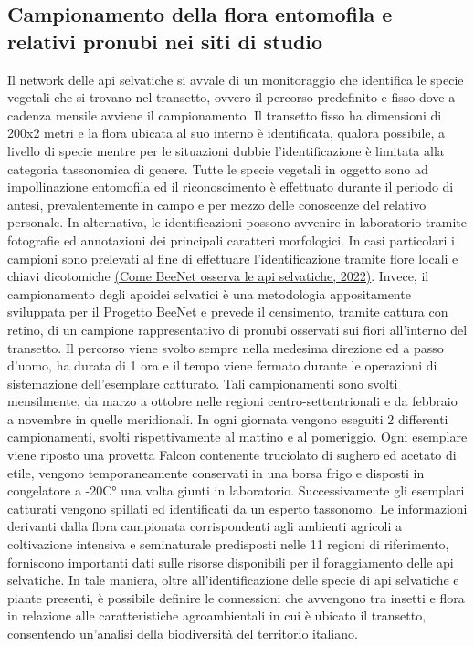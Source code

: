 \documentclass[main.tex]{subfiles}
\begin{document}
\subsection{Campionamento della flora entomofila e relativi pronubi nei siti di studio}

Il network delle api selvatiche si avvale di un monitoraggio che identifica le specie vegetali che si trovano nel transetto, ovvero il percorso predefinito e fisso dove a cadenza mensile avviene il campionamento. Il transetto fisso ha dimensioni di 200x2 metri e la flora ubicata al suo interno è identificata, qualora possibile, a livello di specie mentre per le situazioni dubbie l’identificazione è limitata alla categoria tassonomica di genere. Tutte le specie vegetali in oggetto sono ad impollinazione entomofila ed il riconoscimento è effettuato durante il periodo di antesi, prevalentemente in campo e per mezzo delle conoscenze del relativo personale. In alternativa, le identificazioni possono avvenire in laboratorio tramite fotografie ed annotazioni dei principali caratteri morfologici. In casi particolari i campioni sono prelevati al fine di effettuare l’identificazione tramite flore locali e chiavi dicotomiche \href{https://beenet.crea.gov.it/2022/07/31/come-beenet-osserva-le-api-selvatiche\%EF\%BF\%BC/}{(Come BeeNet osserva le api selvatiche, 2022)}.
Invece, il campionamento degli apoidei selvatici è una metodologia appositamente sviluppata per il Progetto BeeNet e prevede il censimento, tramite cattura con retino, di un campione rappresentativo di pronubi osservati sui fiori all'interno del transetto. Il percorso viene svolto sempre nella medesima direzione ed a passo d’uomo, ha durata di 1 ora e il tempo viene fermato durante le operazioni di sistemazione dell’esemplare catturato. Tali campionamenti sono svolti mensilmente, da marzo a ottobre nelle regioni centro-settentrionali e da febbraio a novembre in quelle meridionali. In ogni giornata vengono eseguiti 2 differenti campionamenti, svolti rispettivamente al mattino e al pomeriggio. Ogni esemplare viene riposto una provetta Falcon contenente truciolato di sughero ed acetato di etile, vengono temporaneamente conservati in una borsa frigo e disposti in congelatore a -20C° una volta giunti in laboratorio. Successivamente gli esemplari catturati vengono spillati ed identificati da un esperto tassonomo.
Le informazioni derivanti dalla flora campionata corrispondenti agli ambienti agricoli a coltivazione intensiva e seminaturale predisposti nelle 11 regioni di riferimento, forniscono importanti dati sulle risorse disponibili per il foraggiamento delle api selvatiche. In tale maniera, oltre all’identificazione delle specie di api selvatiche e piante presenti, è possibile definire le connessioni che avvengono tra insetti e flora in relazione alle caratteristiche agroambientali in cui è ubicato il transetto, consentendo un’analisi della biodiversità del territorio italiano.
\end{document}
